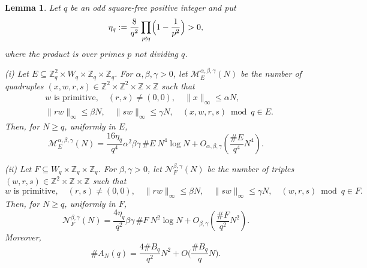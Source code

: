 \documentclass[10pt,a4paper]{amsart}
\newtheorem{lemma}[theorem]{Lemma}
\numberwithin{equation}{section}
\newcommand{\norm}[1]{\lVert #1\rVert_\infty}
\renewcommand{\le}{\leqslant}
\renewcommand{\ge}{\geqslant}
\begin{document}
\begin{lemma}\label{lm:lifting}
Let $q$ be an odd square-free positive integer and put
\[ \eta_q:=\frac8{q^2}\prod_{p\nmid q}\Bigl(1-\frac1{p^2}\Bigr)>0, \]
where the product is over primes $p$ not dividing $q$.

\emph{(i)} Let
$E\subseteq\mathbb{Z}_q^2\times W_q\times\mathbb{Z}_q\times\mathbb{Z}_q$. For $\alpha,\beta,\gamma>0$, let $\mathcal{M}_E^{\alpha,\beta,\gamma}(N)$ be the number of quadruples $(x,w,r,s)\in\mathbb{Z}^2\times\mathbb{Z}^2\times\mathbb{Z}\times\mathbb{Z}$ such that
\begin{align*}
& w\text{ is primitive},\quad (r,s)\ne(0,0),\quad \norm{x}\le\alpha N,\\
& \norm{rw}\le\beta N,
\quad \norm{sw}\le\gamma N,
\quad (x,w,r,s)\bmod q\in E.
\end{align*}
Then, for $N\ge q$, uniformly in $E$,
\begin{equation}\label{eq:unifiedlifting}
\mathcal{M}_E^{\alpha,\beta,\gamma}(N)
=\frac{16\eta_q}{q^4}\alpha^2\beta\gamma\,\#E\ N^4\log N
+O_{\alpha,\beta,\gamma}\!\left(\frac{\#E}{q^4}N^4\right).
\end{equation}

\emph{(ii)} Let $F\subseteq W_q\times\mathbb{Z}_q\times\mathbb{Z}_q$. For $\beta,\gamma>0$, let $\mathcal{N}_F^{\beta,\gamma}(N)$ be the number of triples $(w,r,s)\in\mathbb{Z}^2\times\mathbb{Z}\times\mathbb{Z}$ such that
\[ w\text{ is primitive},\quad (r,s)\ne(0,0),\quad
\norm{rw}\le\beta N,
\quad \norm{sw}\le\gamma N,
\quad (w,r,s)\bmod q\in F. \]
Then, for $N\ge q$, uniformly in $F$,
\begin{equation}\label{eq:pinnedlifting}
\mathcal{N}_F^{\beta,\gamma}(N)
=\frac{4\eta_q}{q^2}\beta\gamma\,\#F\ N^2\log N +O_{\beta,\gamma}\left(\frac{\#F}{q^2}N^2\right).
\end{equation}
Moreover,
\begin{equation}\label{eq:ANuniform}
\#A_N(q)=\frac{4\#B_q}{q^2}N^2 + O\biggl(\frac{\#B_q}{q}N\biggr).
\end{equation}
\end{lemma}
\end{document}
